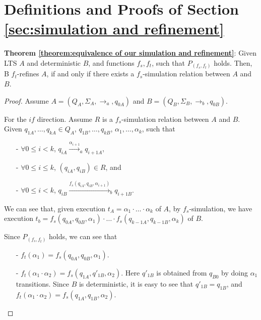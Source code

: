 \section{Definitions and Proofs of Section \ref{sec:simulation and refinement}}
\label{sec:appendix definitions and proofs of section simulation and refinement}


{\noindent \bf Theorem \ref{theorem:equivalence of our simulation and refinement}}: Given LTS $A$ and deterministic $B$, and functions $f_s,f_t$, such that $P_{(f_s,f_t)}$ holds. Then, B $f_t$-refines $A$, if and only if there exists a $f_s$-simulation relation between $A$ and $B$.

\begin {proof}
Assume $A = (Q_A,\Sigma_A,\rightarrow_a,q_{0A})$ and $B = (Q_B,\Sigma_B,\rightarrow_b,q_{0B})$.

For the $\textit{if}$ direction. Assume $R$ is a $f_s$-simulation relation between $A$ and $B$. Given $q_{1A},\ldots,q_{kA} \in Q_A$, $q_{1B},\ldots,q_{kB}$, $\alpha_1,\ldots,\alpha_k$, such that

\begin{itemize}
\setlength{\itemsep}{0.5pt}
\item[-] $\forall 0 \leq i < k$, $q_{iA} {\xrightarrow{\alpha_{i+1}}}_a q_{i+1A}$,

\item[-] $\forall 0 \leq i \leq k$, $(q_{iA},q_{iB}) \in R$, and

\item[-] $\forall 0 \leq i < k$, $q_{iB} {\xrightarrow{f_s(q_{iA},q_{iB},\alpha_{i+1})}}_b q_{i+1B}$.
\end{itemize}

We can see that, given execution $t_A = \alpha_1 \cdot \ldots \cdot \alpha_k$ of $A$, by $f_s$-simulation, we have execution $t_b = f_s(q_{0A},q_{0B},\alpha_1) \cdot \ldots \cdot f_s(q_{k-1A},q_{k-1B},\alpha_k)$ of $B$.

Since $P_{(f_s,f_t)}$ holds, we can see that

\begin{itemize}
\setlength{\itemsep}{0.5pt}
\item[-] $f_t(\alpha_1) = f_s(q_{0A},q_{0B},\alpha_1)$.

\item[-] $f_t(\alpha_1 \cdot \alpha_2) = f_s(q_{1A},q'_{1B},\alpha_2)$. Here $q'_{1B}$ is obtained from $q_{B0}$ by doing $\alpha_1$ transitions. Since $B$ is deterministic, it is easy to see that $q'_{1B} = q_{1B}$, and $f_t(\alpha_1 \cdot \alpha_2) = f_s(q_{1A},q_{1B},\alpha_2)$.


\end{itemize}
\end{proof}

